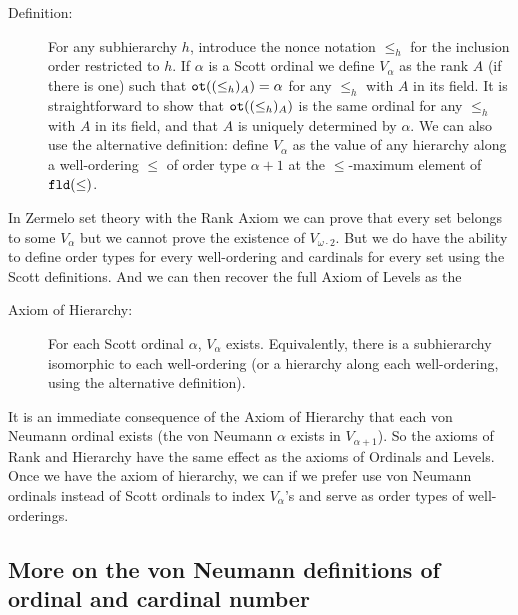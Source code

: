 \documentclass[12pt]{book}
\begin{document}
\begin{description}


\item[Definition:] For any subhierarchy $h$, introduce the nonce
notation $\leq_h$ for the inclusion order restricted to $h$.  If
$\alpha$ is a Scott ordinal we define $V_{\alpha}$ as the rank $A$ (if
there is one) such that ${\tt ot}((\leq_h)_A) = \alpha$ for any
$\leq_h$ with $A$ in its field.  It is straightforward to show that
${\tt ot}((\leq_h)_A)$ is the same ordinal for any $\leq_h$ with $A$
in its field, and that $A$ is uniquely determined by $\alpha$.  We can also use the alternative definition:  define $V_{\alpha}$ as
the value of any hierarchy along a well-ordering $\leq$ of order type $\alpha+1$ at the $\leq$-maximum element of ${\tt fld}(\leq)$.

\end{description}

In Zermelo set theory with the Rank Axiom we can prove that every set
belongs to some $V_{\alpha}$ but we cannot prove the existence of
$V_{\omega\cdot 2}$.  But we do have the ability to define order types
for every well-ordering and cardinals for every set using the Scott
definitions.  And we can then recover the full Axiom of Levels as the

\begin{description}

\item[Axiom of Hierarchy:]  For each Scott ordinal $\alpha$, $V_{\alpha}$ exists.  Equivalently, there is a subhierarchy isomorphic to each well-ordering (or a hierarchy along each well-ordering, using the alternative definition).

\end{description}

It is an immediate consequence of the Axiom of Hierarchy that each von Neumann ordinal exists (the von Neumann $\alpha$ exists in $V_{\alpha+1}$).  So the axioms of Rank and Hierarchy have the same effect as the axioms of Ordinals and Levels.  Once we have the axiom of hierarchy, we can if we prefer use von Neumann ordinals instead of Scott ordinals to index $V_{\alpha}$'s and serve as order types of well-orderings.



\newpage


\newpage

\subsection
{More on the von Neumann definitions of ordinal and cardinal number}
\end{document}
